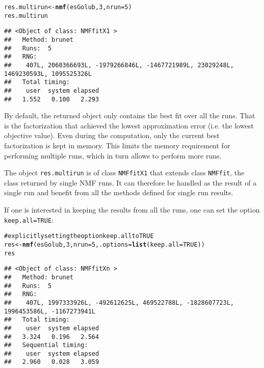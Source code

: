 \documentclass[a4paper]{article}\usepackage{graphicx, color}
\makeatletter
\newcommand{\hlfunctioncall}[1]{\textcolor[rgb]{0.501960784313725,0,0.329411764705882}{\textbf{#1}}}%
\newcommand{\hlcomment}[1]{\textcolor[rgb]{0.180392156862745,0.6,0.341176470588235}{#1}}%
\newenvironment{kframe}{%
 \def\at@end@of@kframe{}%
 \ifinner\ifhmode%
  \def\at@end@of@kframe{\end{minipage}}%
  \begin{minipage}{\columnwidth}%
 \fi\fi%
 \def\FrameCommand##1{\hskip\@totalleftmargin \hskip-\fboxsep
 \colorbox{shadecolor}{##1}\hskip-\fboxsep
     \hskip-\linewidth \hskip-\@totalleftmargin \hskip\columnwidth}%
 \MakeFramed {\advance\hsize-\width
   \@totalleftmargin\z@ \linewidth\hsize
   \@setminipage}}%
 {\par\unskip\endMakeFramed%
 \at@end@of@kframe}
\newenvironment{knitrout}{}{} %
\let\code=\texttt
\makeatother
\begin{document}
\begin{knitrout}
\color{fgcolor}\begin{kframe}
\begin{alltt}
res.multirun <- \hlfunctioncall{nmf}(esGolub, 3, nrun = 5)
res.multirun
\end{alltt}
\begin{verbatim}
## <Object of class: NMFfitX1 >
##   Method: brunet 
##   Runs:  5 
##   RNG:
##    407L, 2060366693L, -1979266846L, -1467721989L, 23029248L, 1469230593L, 1095525326L 
##   Total timing:
##    user  system elapsed 
##   1.552   0.100   2.293
\end{verbatim}
\end{kframe}
\end{knitrout}


By default, the returned object only contains the best fit over all the runs.
That is the factorization that achieved the lowest approximation error (i.e. the lowest objective value).
Even during the computation, only the current best factorization is kept in memory.
This limits the memory requirement for performing multiple runs, which in turn allows to perform more runs.

The object \code{res.multirun} is of class \code{NMFfitX1} that extends class \code{NMFfit}, the class returned by single NMF runs. 
It can therefore be handled as the result of a single run and benefit from all the methods defined for single run results.

\medskip
If one is interested in keeping the results from all the runs, one can set the option \code{keep.all=TRUE}:

\begin{knitrout}
\color{fgcolor}\begin{kframe}
\begin{alltt}
\hlcomment{# explicitly setting the option keep.all to TRUE}
res <- \hlfunctioncall{nmf}(esGolub, 3, nrun = 5, .options = \hlfunctioncall{list}(keep.all = TRUE))
res
\end{alltt}
\begin{verbatim}
## <Object of class: NMFfitXn >
##   Method: brunet 
##   Runs:  5 
##   RNG:
##    407L, 1997333926L, -492612625L, 469522788L, -1828607723L, 1996453586L, -1167273941L 
##   Total timing:
##    user  system elapsed 
##   3.324   0.196   2.564 
##   Sequential timing:
##    user  system elapsed 
##   2.960   0.028   3.059
\end{verbatim}
\end{kframe}
\end{knitrout}
\end{document}
